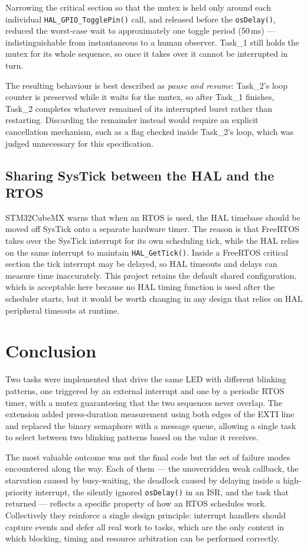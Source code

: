\documentclass[11pt,a4paper]{article}
\begin{document}
Narrowing the critical section so that the mutex is held only around each
individual \texttt{HAL\_GPIO\_TogglePin()} call, and released before the
\texttt{osDelay()}, reduced the worst-case wait to approximately one toggle
period (50\,ms) --- indistinguishable from instantaneous to a human observer.
Task\_1 still holds the mutex for its whole sequence, so once it takes over it
cannot be interrupted in turn.

The resulting behaviour is best described as \emph{pause and resume}: Task\_2's
loop counter is preserved while it waits for the mutex, so after Task\_1
finishes, Task\_2 completes whatever remained of its interrupted burst rather
than restarting. Discarding the remainder instead would require an explicit
cancellation mechanism, such as a flag checked inside Task\_2's loop, which was
judged unnecessary for this specification.

\subsection{Sharing SysTick between the HAL and the RTOS}

STM32CubeMX warns that when an RTOS is used, the HAL timebase should be moved
off SysTick onto a separate hardware timer. The reason is that FreeRTOS takes
over the SysTick interrupt for its own scheduling tick, while the HAL relies on
the same interrupt to maintain \texttt{HAL\_GetTick()}. Inside a FreeRTOS
critical section the tick interrupt may be delayed, so HAL timeouts and delays
can measure time inaccurately. This project retains the default shared
configuration, which is acceptable here because no HAL timing function is used
after the scheduler starts, but it would be worth changing in any design that
relies on HAL peripheral timeouts at runtime.

\section{Conclusion}

Two tasks were implemented that drive the same LED with different blinking
patterns, one triggered by an external interrupt and one by a periodic RTOS
timer, with a mutex guaranteeing that the two sequences never overlap. The
extension added press-duration measurement using both edges of the EXTI line
and replaced the binary semaphore with a message queue, allowing a single task
to select between two blinking patterns based on the value it receives.

The most valuable outcome was not the final code but the set of failure modes
encountered along the way. Each of them --- the unoverridden weak callback, the
starvation caused by busy-waiting, the deadlock caused by delaying inside a
high-priority interrupt, the silently ignored \texttt{osDelay()} in an ISR, and
the task that returned --- reflects a specific property of how an RTOS
schedules work. Collectively they reinforce a single design principle:
interrupt handlers should capture events and defer all real work to tasks,
which are the only context in which blocking, timing and resource arbitration
can be performed correctly.
\end{document}
